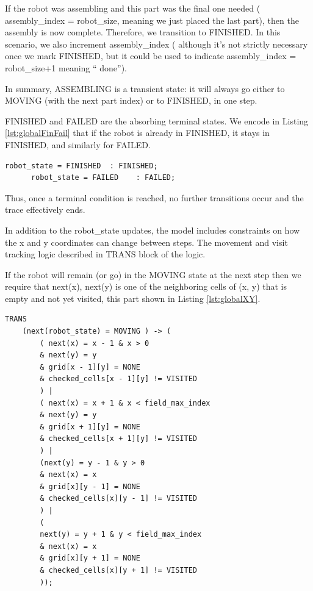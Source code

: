 If the robot was assembling and this part was the final one needed (
assembly\_index = robot\_size, meaning we just placed the last part), 
then the assembly is now complete. 
Therefore, we transition to FINISHED.
In this scenario, we also increment assembly\_index (
although it’s not strictly necessary once we mark FINISHED, but it 
could be used to indicate assembly\_index = robot\_size+1 meaning “
done”).

In summary, ASSEMBLING is a transient state: it will always go either to 
MOVING (with the next part index) or to FINISHED, in one step.

FINISHED and FAILED are the absorbing terminal states. We encode in Listing \ref{lst:globalFinFail} 
that if the robot is already in FINISHED, it stays in FINISHED, and similarly for FAILED. 

\begin{lstlisting}[language=NuSMV, caption={Terminal conditions for FINISHED and FAILED}, 
    label={lst:globalFinFail}]
      robot_state = FINISHED  : FINISHED;
      robot_state = FAILED    : FAILED;
\end{lstlisting}

Thus, once a terminal condition is reached, no further transitions occur 
and the trace effectively ends.



In addition to the robot\_state updates, the model includes constraints on 
how the x and y coordinates can change between steps. 
The movement and visit tracking logic described in TRANS block of the logic. 

If the robot will remain (or go) in the MOVING state at the next step
then we require that next(x), next(y) is one of the neighboring cells 
of (x, y) that is empty and not yet visited, this part shown  in Listing \ref{lst:globalXY}. 

\begin{lstlisting}[language=NuSMV, caption={Transition of x and y coordinates during MOVING}, 
    label={lst:globalXY}]
  TRANS 
    (next(robot_state) = MOVING ) -> (   
        ( next(x) = x - 1 & x > 0  
        & next(y) = y 
        & grid[x - 1][y] = NONE
        & checked_cells[x - 1][y] != VISITED
        ) |
        ( next(x) = x + 1 & x < field_max_index  
        & next(y) = y 
        & grid[x + 1][y] = NONE
        & checked_cells[x + 1][y] != VISITED 
        ) |
        (next(y) = y - 1 & y > 0 
        & next(x) = x 
        & grid[x][y - 1] = NONE
        & checked_cells[x][y - 1] != VISITED
        ) |
        (
        next(y) = y + 1 & y < field_max_index  
        & next(x) = x 
        & grid[x][y + 1] = NONE
        & checked_cells[x][y + 1] != VISITED 
        ));
\end{lstlisting}


